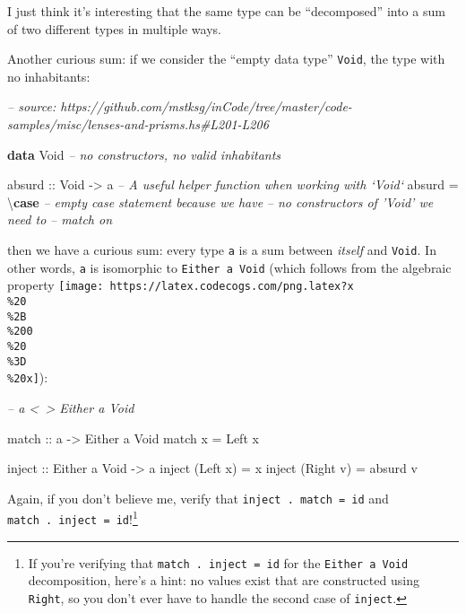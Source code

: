 \documentclass[]{article}
\newenvironment{Shaded}{}{}
\newcommand{\CommentTok}[1]{\textcolor[rgb]{0.38,0.63,0.69}{\textit{#1}}}
\newcommand{\DataTypeTok}[1]{\textcolor[rgb]{0.56,0.13,0.00}{#1}}
\newcommand{\FunctionTok}[1]{\textcolor[rgb]{0.02,0.16,0.49}{#1}}
\newcommand{\KeywordTok}[1]{\textcolor[rgb]{0.00,0.44,0.13}{\textbf{#1}}}
\newcommand{\NormalTok}[1]{#1}
\newcommand{\OtherTok}[1]{\textcolor[rgb]{0.00,0.44,0.13}{#1}}
\begin{document}
I just think it's interesting that the same type can be ``decomposed'' into a
sum of two different types in multiple ways.

Another curious sum: if we consider the ``empty data type'' \texttt{Void}, the
type with no inhabitants:

\begin{Shaded}
\begin{Highlighting}[]
\CommentTok{-- source: https://github.com/mstksg/inCode/tree/master/code-samples/misc/lenses-and-prisms.hs#L201-L206}

\KeywordTok{data} \DataTypeTok{Void}           \CommentTok{-- no constructors, no valid inhabitants}

\OtherTok{absurd ::} \DataTypeTok{Void} \OtherTok{->}\NormalTok{ a     }\CommentTok{-- A useful helper function when working with `Void`}
\NormalTok{absurd }\FunctionTok{=}\NormalTok{ \textbackslash{}}\KeywordTok{case} \CommentTok{-- empty case statement because we have}
               \CommentTok{-- no constructors of 'Void' we need to}
               \CommentTok{-- match on}
\end{Highlighting}
\end{Shaded}

then we have a curious sum: every type \texttt{a} is a sum between \emph{itself}
and \texttt{Void}. In other words, \texttt{a} is isomorphic to
\texttt{Either\ a\ Void} (which follows from the algebraic property
\texttt{[image: https://latex.codecogs.com/png.latex?x\\\%20\\\%2B\\\%200\\\%20\\\%3D\\\%20x]}):

\begin{Shaded}
\begin{Highlighting}[]
\CommentTok{-- a <~> Either a Void}

\OtherTok{match ::}\NormalTok{ a }\OtherTok{->} \DataTypeTok{Either}\NormalTok{ a }\DataTypeTok{Void}
\NormalTok{match x }\FunctionTok{=} \DataTypeTok{Left}\NormalTok{ x}

\OtherTok{inject ::} \DataTypeTok{Either}\NormalTok{ a }\DataTypeTok{Void} \OtherTok{->}\NormalTok{ a}
\NormalTok{inject (}\DataTypeTok{Left}\NormalTok{  x) }\FunctionTok{=}\NormalTok{ x}
\NormalTok{inject (}\DataTypeTok{Right}\NormalTok{ v) }\FunctionTok{=}\NormalTok{ absurd v}
\end{Highlighting}
\end{Shaded}

Again, if you don't believe me, verify that \texttt{inject\ .\ match\ =\ id} and
\texttt{match\ .\ inject\ =\ id}!\footnote{If you're verifying that
  \texttt{match\ .\ inject\ =\ id} for the \texttt{Either\ a\ Void}
  decomposition, here's a hint: no values exist that are constructed using
  \texttt{Right}, so you don't ever have to handle the second case of
  \texttt{inject}.}
\end{document}
